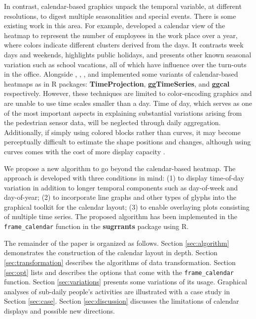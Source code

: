 \documentclass[12pt]{article}
\begin{document}
In contrast, calendar-based graphics unpack the temporal variable, at different resolutions, to digest multiple seasonalities and special events. There is some existing work in this area. For example, \citet{VanWijkCluster1999} developed a calendar view of the heatmap to represent the number of employees in the work place over a year, where colors indicate different clusters derived from the days. It contrasts week days and weekends, highlights public holidays, and presents other known seasonal variation such as school vacations, all of which have influence over the turn-outs in the office. Alongside \citet{Jones-heatmap}, \citet{R-TimeProjection}, \citet{R-ggTimeSeries}, and \citet{R-ggcal} implemented some variants of calendar-based heatmaps as in R packages: \textbf{TimeProjection}, \textbf{ggTimeSeries}, and \textbf{ggcal} respectively. However, these techniques are limited to color-encoding graphics and are unable to use time scales smaller than a day. Time of day, which serves as one of the most important aspects in explaining substantial variations arising from the pedestrian sensor data, will be neglected through daily aggregation. Additionally, if simply using colored blocks rather than curves, it may become perceptually difficult to estimate the shape positions and changes, although using curves comes with the cost of more display capacity \citep{cleveland1984graphical, lam2007overview}.

We propose a new algorithm to go beyond the calendar-based heatmap. The approach is developed with three conditions in mind: (1) to display time-of-day variation in addition to longer temporal components such as day-of-week and day-of-year; (2) to incorporate line graphs and other types of glyphs into the graphical toolkit for the calendar layout; (3) to enable overlaying plots consisting of multiple time series. The proposed algorithm has been implemented in the \texttt{frame\_calendar} function in the \textbf{sugrrants} package using R.

The remainder of the paper is organized as follows. Section \ref{sec:algorithm} demonstrates the construction of the calendar layout in depth. Section \ref{sec:transformation} describes the algorithms of data transformation. Section \ref{sec:opt} lists and describes the options that come with the \texttt{frame\_calendar} function. Section \ref{sec:variations} presents some variations of its usage. Graphical analyses of sub-daily people's activities are illustrated with a case study in Section \ref{sec:case}. Section \ref{sec:discussion} discusses the limitations of calendar displays and possible new directions.
\end{document}
